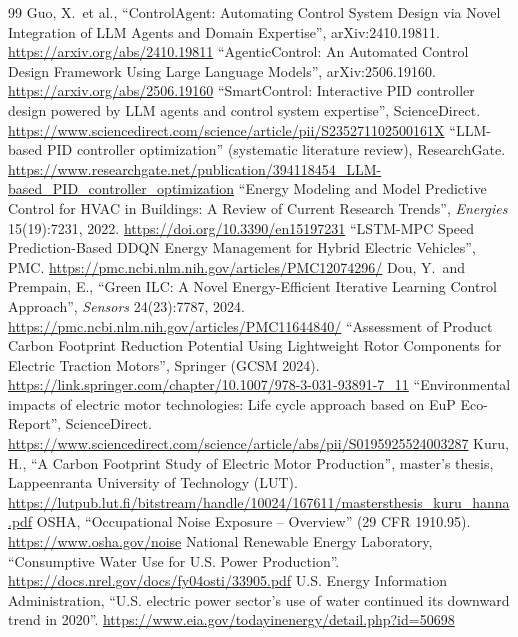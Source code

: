 \documentclass[a4paper,11pt]{article}
\begin{document}
\begin{thebibliography}{99}\small
{} Guo, X.\ et al., ``ControlAgent: Automating Control System Design via Novel Integration of LLM Agents and Domain Expertise'', arXiv:2410.19811. \url{https://arxiv.org/abs/2410.19811}
 ``AgenticControl: An Automated Control Design Framework Using Large Language Models'', arXiv:2506.19160. \url{https://arxiv.org/abs/2506.19160}
 ``SmartControl: Interactive PID controller design powered by LLM agents and control system expertise'', ScienceDirect. \url{https://www.sciencedirect.com/science/article/pii/S235271102500161X}
 ``LLM-based PID controller optimization'' (systematic literature review), ResearchGate. \url{https://www.researchgate.net/publication/394118454_LLM-based_PID_controller_optimization}
 ``Energy Modeling and Model Predictive Control for HVAC in Buildings: A Review of Current Research Trends'', \emph{Energies} 15(19):7231, 2022. \url{https://doi.org/10.3390/en15197231}
 ``LSTM-MPC Speed Prediction-Based DDQN Energy Management for Hybrid Electric Vehicles'', PMC. \url{https://pmc.ncbi.nlm.nih.gov/articles/PMC12074296/}
 Dou, Y.\ and Prempain, E., ``Green ILC: A Novel Energy-Efficient Iterative Learning Control Approach'', \emph{Sensors} 24(23):7787, 2024. \url{https://pmc.ncbi.nlm.nih.gov/articles/PMC11644840/}
 ``Assessment of Product Carbon Footprint Reduction Potential Using Lightweight Rotor Components for Electric Traction Motors'', Springer (GCSM 2024). \url{https://link.springer.com/chapter/10.1007/978-3-031-93891-7_11}
 ``Environmental impacts of electric motor technologies: Life cycle approach based on EuP Eco-Report'', ScienceDirect. \url{https://www.sciencedirect.com/science/article/abs/pii/S0195925524003287}
 Kuru, H., ``A Carbon Footprint Study of Electric Motor Production'', master's thesis, Lappeenranta University of Technology (LUT). \url{https://lutpub.lut.fi/bitstream/handle/10024/167611/mastersthesis_kuru_hanna.pdf}
 OSHA, ``Occupational Noise Exposure -- Overview'' (29 CFR 1910.95). \url{https://www.osha.gov/noise}
 National Renewable Energy Laboratory, ``Consumptive Water Use for U.S. Power Production''. \url{https://docs.nrel.gov/docs/fy04osti/33905.pdf}
 U.S. Energy Information Administration, ``U.S. electric power sector's use of water continued its downward trend in 2020''. \url{https://www.eia.gov/todayinenergy/detail.php?id=50698}

\end{thebibliography}
\end{document}
